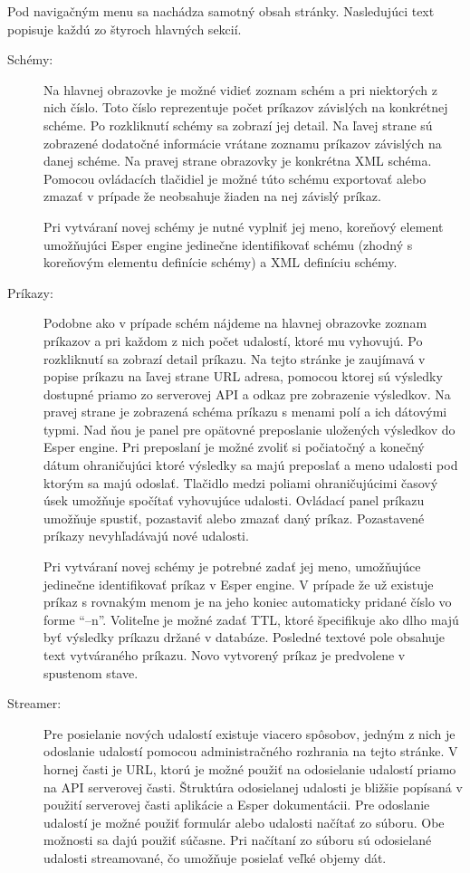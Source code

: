 	Pod navigačným menu sa nachádza samotný obsah stránky. Nasledujúci text popisuje každú zo štyroch hlavných sekcií.
	\begin{description}
		\item[Schémy:] Na hlavnej obrazovke je možné vidieť zoznam schém a pri niektorých z nich číslo. Toto číslo reprezentuje počet príkazov závislých na konkrétnej schéme. Po rozkliknutí schémy sa zobrazí jej detail. Na ľavej strane sú zobrazené dodatočné informácie vrátane zoznamu príkazov závislých na danej schéme. Na pravej strane obrazovky je konkrétna XML schéma. Pomocou ovládacích tlačidiel je možné túto schému exportovať alebo zmazať v prípade že neobsahuje žiaden na nej závislý príkaz.

		Pri vytváraní novej schémy je nutné vyplniť jej meno, koreňový element umožňujúci Esper engine jedinečne identifikovať schému (zhodný s koreňovým elementu definície schémy) a XML definíciu schémy.

		\item[Príkazy:] Podobne ako v prípade schém nájdeme na hlavnej obrazovke zoznam príkazov a pri každom z nich počet udalostí, ktoré mu vyhovujú. Po rozkliknutí sa zobrazí detail príkazu. Na tejto stránke je zaujímavá v popise príkazu na ľavej strane URL adresa, pomocou ktorej sú výsledky dostupné priamo zo serverovej API a odkaz pre zobrazenie výsledkov.
		Na pravej strane je zobrazená schéma príkazu s menami polí a ich dátovými typmi. Nad ňou je panel pre opätovné preposlanie uložených výsledkov do Esper engine. Pri preposlaní je možné zvoliť si počiatočný a konečný dátum ohraničujúci ktoré výsledky sa majú preposlať a meno udalosti pod ktorým sa majú odoslať. Tlačidlo medzi poliami ohraničujúcimi časový úsek umožňuje spočítať vyhovujúce udalosti.
		Ovládací panel príkazu umožňuje spustiť, pozastaviť alebo zmazať daný príkaz. Pozastavené príkazy nevyhľadávajú nové udalosti.
		
		Pri vytváraní novej schémy je potrebné zadať jej meno, umožňujúce jedinečne identifikovať príkaz v Esper engine. V prípade že už existuje príkaz s rovnakým menom je na jeho koniec automaticky pridané číslo vo forme ``--n''. Voliteľne je možné zadať TTL, ktoré špecifikuje ako dlho majú byť výsledky príkazu držané v databáze. Posledné textové pole obsahuje text vytváraného príkazu. Novo vytvorený príkaz je predvolene v spustenom stave.
		
		\item[Streamer:] Pre posielanie nových udalostí existuje viacero spôsobov, jedným z nich je odoslanie udalostí pomocou administračného rozhrania na tejto stránke. V hornej časti je URL, ktorú je možné použiť na odosielanie udalostí priamo na API serverovej časti. Štruktúra odosielanej udalosti je bližšie popísaná v použití serverovej časti aplikácie a Esper dokumentácii.
		Pre odoslanie udalostí je možné použiť formulár alebo udalosti načítať zo súboru. Obe možnosti sa dajú použiť súčasne. Pri načítaní zo súboru sú odosielané udalosti streamované, čo umožňuje posielať veľké objemy dát.


\end{description}
